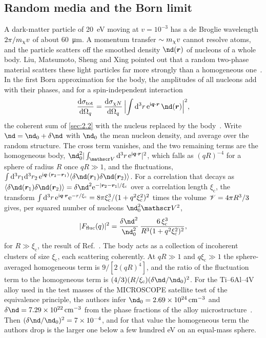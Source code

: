 \subsection{Random media and the Born limit}\label{sec:16.7-random}

A dark-matter particle of \SI{20}{eV} moving at $v = 10^{-3}$ has a de Broglie wavelength $2\pi/m_{\chi} v$ of about \SI{60}{\micro m}. A momentum transfer $\sim m_{\chi} v$ cannot resolve atoms, and the particle scatters off the smoothed density $\nd(\vect{r})$ of nucleons of a whole body. Liu, Matsumoto, Sheng and Xing pointed out that a random two-phase material scatters these light particles far more strongly than a homogeneous one~\cite{liu2025coherence}. In the first Born approximation for the body, the amplitudes of all nucleons add with their phases, and for a spin-independent interaction
\begin{equation}
  \frac{\dd\sigma_{\mathrm{tot}}}{\dd\Omega_q} = \frac{\dd\sigma_{\chi N}}{\dd\Omega_q}\,\Bigl|\int\dd^3r\,\ee^{\ii\vect{q}\cdot\vect{r}}\,\nd(\vect{r})\Bigr|^2 ,
  \label{eq:16.7-born}
\end{equation}
the coherent sum of \cref{sec:2.2} with the nucleus replaced by the body~\cite[Eq.~(2)]{liu2025coherence}. Write $\nd = \nd_0 + \delta\nd$ with $\nd_0$ the mean nucleon density, and average over the random structure. The cross term vanishes, and the two remaining terms are the homogeneous body, $\nd_0^2|\int_{\Vol}\dd^3r\,\ee^{\ii\vect{q}\cdot\vect{r}}|^2$, which falls as $(qR)^{-4}$ for a sphere of radius $R$ once $qR \gg 1$, and the fluctuations, $\int\dd^3r_1\dd^3r_2\,\ee^{\ii\vect{q}\cdot(\vect{r}_2 - \vect{r}_1)}\langle\delta\nd(\vect{r}_1)\delta\nd(\vect{r}_2)\rangle$. For a correlation that decays as $\langle\delta\nd(\vect{r}_1)\delta\nd(\vect{r}_2)\rangle = \delta\nd^2\ee^{-|\vect{r}_2 - \vect{r}_1|/\xi_{\mathrm{c}}}$ over a correlation length $\xi_{\mathrm{c}}$, the transform $\int\mathrm{d}^3r\,\mathrm{e}^{\mathrm{i}\bm{q}\cdot\bm{r}}\mathrm{e}^{-r/\xi_{\mathrm{c}}} = 8\pi\xi_{\mathrm{c}}^3/(1 + q^2\xi_{\mathrm{c}}^2)^2$ times the volume $\mathscr{V} = 4\pi R^3/3$ gives, per squared number of nucleons $\nd_0^2\Vol^2$,
\begin{equation}
  |F_{\mathrm{fluc}}(q)|^2 = \frac{\delta\nd^2}{\nd_0^2}\,\frac{6\,\xi_{\mathrm{c}}^3}{R^3(1 + q^2\xi_{\mathrm{c}}^2)^2} ,
  \label{eq:16.7-Ffluc}
\end{equation}
for $R \gg \xi_{\mathrm{c}}$, the result of Ref.~\cite[Eqs.~(9)--(12)]{liu2025coherence}. The body acts as a collection of incoherent clusters of size $\xi_{\mathrm{c}}$, each scattering coherently. At $qR \gg 1$ and $q\xi_{\mathrm{c}} \gg 1$ the sphere-averaged homogeneous term is $9/[2(qR)^4]$, and the ratio of the fluctuation term to the homogeneous term is $(4/3)(R/\xi_{\mathrm{c}})(\delta\nd/\nd_0)^2$. For the Ti--6Al--4V alloy used in the test masses of the MICROSCOPE satellite test of the equivalence principle, the authors infer $\nd_0 = \SI{2.69e24}{cm^{-3}}$ and $\delta\nd = \SI{7.29e22}{cm^{-3}}$ from the phase fractions of the alloy microstructure~\cite[Eq.~(14)]{liu2025coherence}. Then $(\delta\nd/\nd_0)^2 = 7\times10^{-4}$, and for that value the homogeneous term the authors drop is the larger one below a few hundred eV on an equal-mass sphere.

